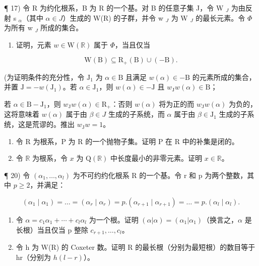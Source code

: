 ¶ 17) 令 R 为约化根系，B 为 R 的一个基。对 B 的任意子集 J，令 W \(_{J}\) 为由反射 s \(_{\alpha}\)（其中 \(\alpha \in J\)）生成的 W(R) 的子群，并令 w \(_{J}\) 为 W \(_{J}\) 的最长元素。令 \(\Phi\) 为所有 w \(_{J}\) 所成的集合。

\begin{enumerate}
\def\labelenumi{\alph{enumi})}
\tightlist
\item
  证明，元素 \(w \in \mathrm{W}(\mathbb{R})\) 属于 \(\Phi\)，当且仅当
\end{enumerate}

\[
\mathrm{W} (\mathrm{B}) \subseteq \mathrm{R} _ {+} (\mathrm{B}) \cup (- \mathrm{B}).
\]

(为证明条件的充分性，令 \(\mathrm{J}_1\) 为 \(\alpha \in \mathrm{B}\) 且满足 \(w(\alpha) \in -\mathrm{B}\) 的元素所成的集合，并置 \(\mathrm{J} = -w(\mathrm{J}_1)\)。若 \(\alpha \in \mathrm{J}_1\)，则 \(w(\alpha) \in -\mathrm{J}\) 且 \(w_{\mathrm{J}}w(\alpha) \in \mathrm{B}\)；

若 \(\alpha \in \mathrm{B} - \mathrm{J}_1\)，则 \(w_{\mathrm{J}}w(\alpha) \in \mathrm{R}_{+}\)：否则 \(w(\alpha)\) 将为正的而 \(w_{\mathrm{J}}w(\alpha)\) 为负的，这将意味着 \(w(\alpha)\) 属于由 \(\beta \in J\) 生成的子系统，而 \(\alpha\) 属于由 \(\beta \in \mathrm{J}_1\) 生成的子系统，这是荒谬的。推出 \(w_{\mathrm{J}}w = 1\)。

\begin{enumerate}
\def\labelenumi{\arabic{enumi})}
\setcounter{enumi}{17}
\item
  令 R 为根系，P 为 R 的一个抛物子集。证明 P 在 R 中的补集是闭的。
\item
  令 \(\mathbb{R}\) 为根系，令 \(x\) 为 \(\mathrm{Q}(\mathbb{R})\) 中长度最小的非零元素。证明 \(x \in \mathbb{R}\)。
\end{enumerate}

¶ 20) 令 \((\alpha_{1},\ldots,\alpha_{l})\) 为不可约约化根系 R 的一个基。令 r 和 p 为两个整数，其中 \(p\geqslant2\)，并满足：

\[
\left(\alpha_ {1} \mid \alpha_ {1}\right) = \dots = \left(\alpha_ {r} \mid \alpha_ {r}\right) = p. \left(\alpha_ {r + 1} \mid \alpha_ {r + 1}\right) = \dots = p. \left(\alpha_ {l} \mid \alpha_ {l}\right).
\]

\begin{enumerate}
\def\labelenumi{\alph{enumi})}
\item
  令 \(\alpha = c_{1}\alpha_{1} + \cdots + c_{l}\alpha_{l}\) 为一个根。证明 \((\alpha|\alpha) = (\alpha_{1}|\alpha_{1})\)（换言之，\(\alpha\) 是长根）当且仅当 p 整除 \(c_{r+1},\ldots,c_{l}\)。
\item
  令 h 为 W(R) 的 Coxeter 数。证明 R 的最长根（分别为最短根）的数目等于 hr（分别为 \(h(l - r)\)）。
\end{enumerate}

